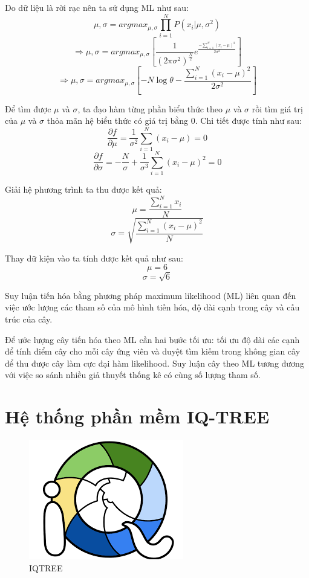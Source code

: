 \documentclass[12pt]{report}
\begin{document}
Do dữ liệu là rời rạc nên ta sử dụng ML như sau:
$$ \mu , \sigma = argmax_{\mu, \sigma} \prod_{i=1} ^ {N} P(x_i | \mu, \sigma^2) $$
$$ \Rightarrow \mu , \sigma = argmax_{\mu, \sigma} [ \frac{1}{({2\pi\sigma^2})^\frac{N}{2}} e^{\frac{-\sum_{i=1}^{N}{(x_i - \mu)}^2}{2\sigma^2}}] $$
$$ \Rightarrow \mu , \sigma = argmax_{\mu, \sigma} [-N \log{\theta} - \frac{\sum_{i=1}^{N} {(x_i - \mu)} ^ 2}{2\sigma^2}] $$

Để tìm được $\mu$ và $\sigma$, ta đạo hàm từng phần biểu thức theo $\mu$ và $\sigma$ rồi tìm giá trị của $\mu$ và $\sigma$ thỏa mãn hệ biểu thức có giá trị bằng 0. Chi tiết được tính như sau:
$$ \frac{\partial f}{\partial \mu} = \frac{1}{\sigma^2} \sum_{i=1}^{N} (x_i - \mu) = 0$$
$$ \frac{\partial f}{\partial \sigma} = -\frac{N}{\sigma} + \frac{1}{\sigma^3} \sum_{i=1}^{N} (x_i - \mu)^2 = 0$$

Giải hệ phương trình ta thu được kết quả:
$$ \mu = \frac{\sum_{i=1}^{N} x_i}{N}$$
$$ \sigma = \sqrt{\frac{\sum_{i=1}^{N} (x_i - \mu)^2}{N}}$$

Thay dữ kiện vào ta tính được kết quả như sau:
$$ \mu = 6 $$
$$ \sigma = \sqrt{6} $$

Suy luận tiến hóa bằng phương pháp maximum likelihood (ML) liên quan đến việc ước lượng các tham số của mô hình tiến hóa, độ dài cạnh trong cây và cấu trúc của cây. 

Để ước lượng cây tiến hóa theo ML cần hai bước tối ưu: tối ưu độ dài các cạnh để tính điểm cây cho mỗi cây ứng viên và duyệt tìm kiếm trong không gian cây để thu được cây làm cực đại hàm likelihood. Suy luận cây theo ML tương đương với việc so sánh nhiều giả thuyết thống kê có cùng số lượng tham số.


\section{Hệ thống phần mềm IQ-TREE}

\begin{figure}[h]
	\centering
	\includegraphics[scale=0.5]{Image/2.2.png}
	\caption{IQTREE}
	\label{fig:image2.2}
\end{figure}
\end{document}

